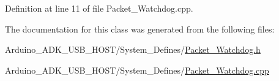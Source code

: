 Definition at line 11 of file Packet\-\_\-\-Watchdog.\-cpp.



The documentation for this class was generated from the following files\-:\begin{DoxyCompactItemize}
\item 
Arduino\-\_\-\-A\-D\-K\-\_\-\-U\-S\-B\-\_\-\-H\-O\-S\-T/\-System\-\_\-\-Defines/\hyperlink{_packet___watchdog_8h}{Packet\-\_\-\-Watchdog.\-h}\item 
Arduino\-\_\-\-A\-D\-K\-\_\-\-U\-S\-B\-\_\-\-H\-O\-S\-T/\-System\-\_\-\-Defines/\hyperlink{_packet___watchdog_8cpp}{Packet\-\_\-\-Watchdog.\-cpp}\end{DoxyCompactItemize}
